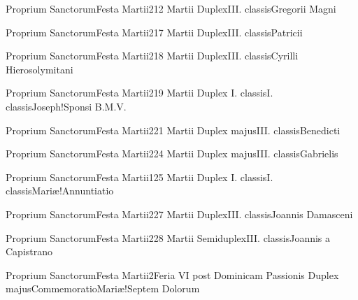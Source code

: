 \documentclass[invitatoriale-romanum.tex]{subfiles}
\begin{document}
	{Proprium Sanctorum}{Festa Martii}{2}{12 Martii}
	{Duplex}{III. classis}{Gregorii Magni}
	{}
	{}

	{Proprium Sanctorum}{Festa Martii}{2}{17 Martii}
	{Duplex}{III. classis}{Patricii}
	{}
	{}

	{Proprium Sanctorum}{Festa Martii}{2}{18 Martii}
	{Duplex}{III. classis}{Cyrilli Hierosolymitani}
	{}
	{}

	{Proprium Sanctorum}{Festa Martii}{2}{19 Martii}
	{Duplex I. classis}{I. classis}{Joseph!Sponsi B.M.V.}
	{}
	{}

	{Proprium Sanctorum}{Festa Martii}{2}{21 Martii}
	{Duplex majus}{III. classis}{Benedicti}
	{}
	{}

	{Proprium Sanctorum}{Festa Martii}{2}{24 Martii}
	{Duplex majus}{III. classis}{Gabrielis}
	{}
	{}

	{Proprium Sanctorum}{Festa Martii}{1}{25 Martii}
	{Duplex I. classis}{I. classis}{Mariæ!Annuntiatio}
	{}
	{}

	{Proprium Sanctorum}{Festa Martii}{2}{27 Martii}
	{Duplex}{III. classis}{Joannis Damasceni}
	{}
	{}

	{Proprium Sanctorum}{Festa Martii}{2}{28 Martii}
	{Semiduplex}{III. classis}{Joannis a Capistrano}
	{}
	{}

	{Proprium Sanctorum}{Festa Martii}{2}{Feria VI post Dominicam Passionis}
	{Duplex majus}{Commemoratio}{Mariæ!Septem Dolorum}
	{}
	{\invitferia}

\end{document}
